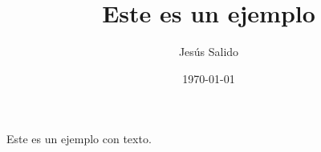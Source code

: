\documentclass[11pt,a4paper]{article}
\author{Jesús Salido}
\title{Este es un ejemplo}
\date{\today}
\begin{document}
\maketitle
Este es un ejemplo con texto.
\end{document}
